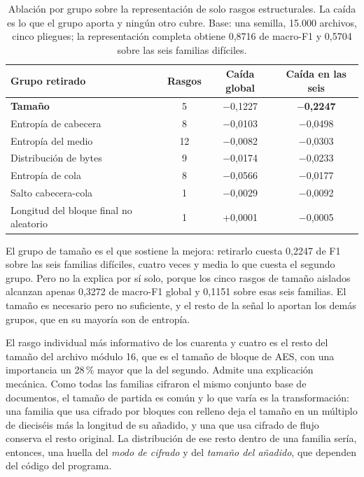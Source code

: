 \begin{table}[ht]
\centering
\caption{Ablación por grupo sobre la representación de solo rasgos estructurales. La caída es lo que el grupo aporta y ningún otro cubre. Base: una semilla, 15.000 archivos, cinco pliegues; la representación completa obtiene 0,8716 de macro-F1 y 0,5704 sobre las seis familias difíciles.}
\label{tab:exp2e_ablacion}
\begin{tabular}{|l|c|c|c|}
\hline
\textbf{Grupo retirado} & \textbf{Rasgos} & \textbf{Caída global} & \textbf{Caída en las seis} \\
\hline
\textbf{Tamaño} & 5 & $-$0,1227 & \textbf{$-$0,2247} \\
Entropía de cabecera & 8 & $-$0,0103 & $-$0,0498 \\
Entropía del medio & 12 & $-$0,0082 & $-$0,0303 \\
Distribución de bytes & 9 & $-$0,0174 & $-$0,0233 \\
Entropía de cola & 8 & $-$0,0566 & $-$0,0177 \\
Salto cabecera-cola & 1 & $-$0,0029 & $-$0,0092 \\
Longitud del bloque final no aleatorio & 1 & +0,0001 & $-$0,0005 \\
\hline
\end{tabular}
\end{table}

El grupo de tamaño es el que sostiene la mejora: retirarlo cuesta 0,2247 de F1 sobre las seis familias difíciles, cuatro veces y media lo que cuesta el segundo grupo. Pero no la explica por sí solo, porque los cinco rasgos de tamaño aislados alcanzan apenas 0,3272 de macro-F1 global y 0,1151 sobre esas seis familias. El tamaño es necesario pero no suficiente, y el resto de la señal lo aportan los demás grupos, que en su mayoría son de entropía.

El rasgo individual más informativo de los cuarenta y cuatro es el resto del tamaño del archivo módulo 16, que es el tamaño de bloque de AES, con una importancia un 28\,\% mayor que la del segundo. Admite una explicación mecánica. Como todas las familias cifraron el mismo conjunto base de documentos, el tamaño de partida es común y lo que varía es la transformación: una familia que usa cifrado por bloques con relleno deja el tamaño en un múltiplo de dieciséis más la longitud de su añadido, y una que usa cifrado de flujo conserva el resto original. La distribución de ese resto dentro de una familia sería, entonces, una huella del \textit{modo de cifrado} y del \textit{tamaño del añadido}, que dependen del código del programa.


